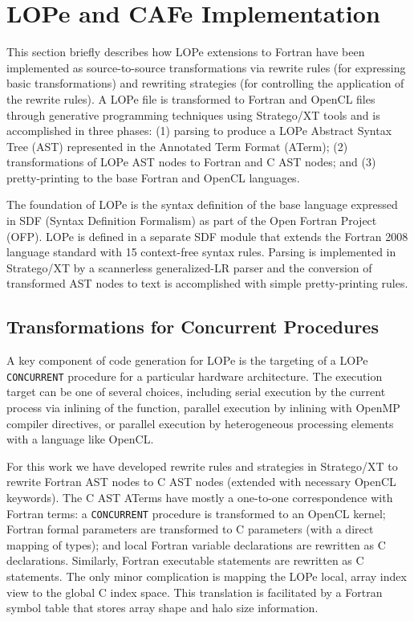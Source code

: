 \section{LOPe and CAFe Implementation}

This section briefly describes how LOPe extensions to Fortran have been implemented as
source-to-source transformations via rewrite rules (for expressing basic transformations) and
rewriting strategies (for controlling the application of the rewrite rules).  A LOPe file is
transformed to Fortran and OpenCL files through generative programming techniques using
Stratego/XT tools\cite{Bravenboer200852} and is accomplished in three phases: (1) parsing to
produce a LOPe Abstract Syntax Tree (AST) represented in the Annotated Term
Format (ATerm\cite{DBLP:journals/spe/BrandJKO00}); (2) transformations of LOPe AST nodes to Fortran
and C AST nodes; and (3) pretty-printing to the base Fortran and OpenCL languages.

The foundation of LOPe is the syntax definition of the base language expressed in
SDF (Syntax Definition Formalism) as part of the Open Fortran Project (OFP)\cite{OFP:git:url}.
LOPe is defined in a separate SDF module that extends the Fortran 2008 language standard with 15
context-free syntax rules.  Parsing is implemented in Stratego/XT by a scannerless generalized-LR
parser and the conversion of transformed AST nodes to text is accomplished with simple
pretty-printing rules.


\subsection{Transformations for Concurrent Procedures}

A key component of code generation for LOPe is the targeting of a LOPe \texttt{CONCURRENT}
procedure for a particular hardware architecture.  The execution target can be one
of several choices, including serial execution by the current process via inlining
of the function, parallel execution by inlining with OpenMP compiler directives, or parallel
execution by heterogeneous processing elements with a language like OpenCL.

For this work we have developed rewrite rules and strategies in Stratego/XT to rewrite Fortran AST
nodes to C AST nodes (extended with necessary OpenCL keywords).  The C AST ATerms have mostly a
one-to-one correspondence with Fortran terms: a \texttt{CONCURRENT} procedure is transformed to an
OpenCL kernel; Fortran formal parameters are transformed to C parameters (with a direct mapping of
types); and local Fortran variable declarations are rewritten as C declarations.  Similarly,
Fortran executable statements are rewritten as C statements.  The only
minor complication is mapping the LOPe local, array index view to the global C index space.  This
translation is facilitated by a Fortran symbol table that stores array shape and halo size
information.

